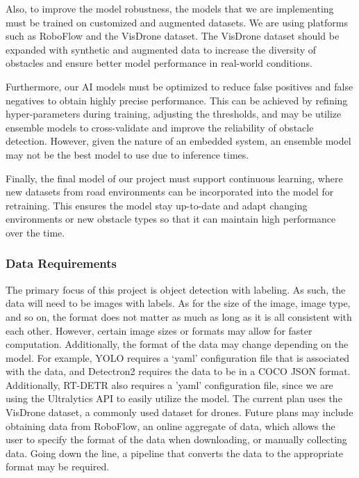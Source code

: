 \documentclass[stu,12pt,floatsintext]{apa7}
\begin{document}
Also, to improve the model robustness, the models that we are implementing must be trained on customized and augmented datasets. We are using platforms such as RoboFlow and the VisDrone dataset. The VisDrone dataset should be expanded with synthetic and augmented data to increase the diversity of obstacles and ensure better model performance in real-world conditions.

Furthermore, our AI models must be optimized to reduce false positives and false negatives to obtain highly precise performance. This can be achieved by refining hyper-parameters during training, adjusting the thresholds, and may be utilize ensemble models to cross-validate and improve the reliability of obstacle detection. However, given the nature of an embedded system, an ensemble model may not be the best model to use due to inference times.

Finally, the final model of our project must support continuous learning, where new datasets from road environments can be incorporated into the model for retraining. This ensures the model stay up-to-date and adapt changing environments or new obstacle types so that it can maintain high performance over the time.

\subsubsection{Data Requirements}
The primary focus of this project is object detection with labeling. As such, the data will need to be images with labels. As for the size of the image, image type, and so on, the format does not matter as much as long as it is all consistent with each other. However, certain image sizes or formats may allow for faster computation. Additionally, the format of the data may change depending on the model. For example, YOLO requires a `yaml' configuration file that is associated with the data, and Detectron2 requires the data to be in a COCO JSON format. Additionally, RT-DETR also requires a 'yaml' configuration file, since we are using the Ultralytics API to easily utilize the model. The current plan uses the VisDrone dataset, a commonly used dataset for drones. Future plans may include obtaining data from RoboFlow, an online aggregate of data, which allows the user to specify the format of the data when downloading, or manually collecting data. Going down the line, a pipeline that converts the data to the appropriate format may be required.
\end{document}

